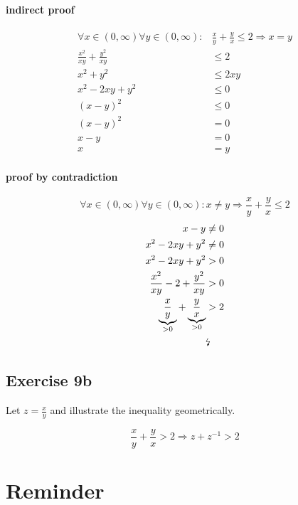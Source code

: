 \documentclass[a4paper]{article}
\theoremstyle{definition}
\begin{document}
\paragraph{indirect proof}
\begin{align*}
  \forall x \in (0, \infty) \forall y \in (0, \infty): &\frac xy + \frac yx \leq 2 \Rightarrow x = y \\
   \frac{x^2}{xy} + \frac{y^2}{xy} &\leq 2 \\
   x^2 + y^2 &\leq 2xy \\
   x^2 - 2xy + y^2 &\leq 0 \\
   (x - y)^2 &\leq 0 \\
   (x - y)^2 &= 0 \\
   x - y &= 0 \\
   x &= y
\end{align*}

\paragraph{proof by contradiction}
\[ \forall x \in (0, \infty) \forall y \in (0, \infty): x \neq y \Rightarrow \frac xy + \frac yx \leq 2 \]
\begin{align*}
  x - y &\neq 0 \\
  x^2 - 2xy + y^2 &\neq 0 \\
  x^2 - 2xy + y^2 &> 0 \\
  \frac{x^2}{xy} - 2 + \frac{y^2}{xy} &> 0 \\
  \underbrace{\frac{x}{y}}_{>0} + \underbrace{\frac{y}{x}}_{>0} &> 2 \\
    &\text{\lightning}
\end{align*}

\subsection{Exercise 9b}
%
Let $z = \frac{x}{y}$ and illustrate the inequality geometrically.

\[ \frac{x}{y} + \frac{y}{x} > 2 \Rightarrow z + z^{-1} > 2 \]


\section{Reminder}
\end{document}

